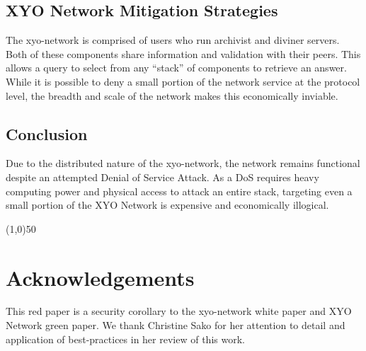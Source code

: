 \documentclass{article}
\begin{document}
\subsection{XYO Network Mitigation Strategies}
The \Gls{xyo-network} is comprised of users who run \Gls{archivist} and \Gls{diviner} servers. Both of these components share information and validation with their peers. This allows a query to select from any ``stack'' of components to retrieve an answer. While it is possible to deny a small portion of the network service at the protocol level, the breadth and scale of the network makes this economically inviable. 

\subsection{Conclusion}
Due to the distributed nature of the \Gls{xyo-network}, the network remains functional despite an attempted Denial of Service Attack. As a DoS requires heavy computing power and physical access to attack an entire stack, targeting even a small portion of the XYO Network is expensive and economically illogical.

\begin{center}
\line(1,0){50}
\end{center}

\section {Acknowledgements}
This red paper is a security corollary to the \Gls{xyo-network} white paper and XYO Network green paper. We thank Christine Sako for her attention to detail and application of best-practices in her review of this work.
\end{document}
